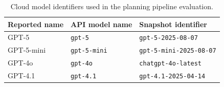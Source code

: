 \begin{table}[htbp]
\centering
\caption{Cloud model identifiers used in the planning pipeline evaluation.}
\label{tab:cloud_llm_metadata}
\begin{tabular}{lll}
\toprule
Reported name & API model name & Snapshot identifier \\
\midrule
GPT-5 & \texttt{gpt-5} & \texttt{gpt-5-2025-08-07} \\
GPT-5-mini & \texttt{gpt-5-mini} & \texttt{gpt-5-mini-2025-08-07} \\
GPT-4o & \texttt{gpt-4o} & \texttt{chatgpt-4o-latest} \\
GPT-4.1 & \texttt{gpt-4.1} & \texttt{gpt-4.1-2025-04-14} \\
\bottomrule
\end{tabular}
\end{table}